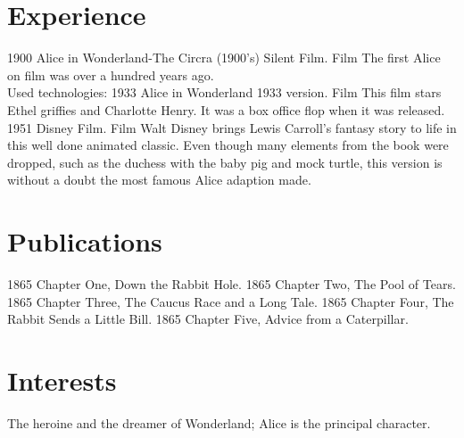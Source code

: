 \documentclass[letterpaper]{curriculum_vitae} %
\begin{document}
\section{Experience}
\begin{twenty}
    \twentyitem
    {1900}
    {Alice in Wonderland-The Circra (1900's) Silent Film.}
    {Film}
    {
        The first Alice on film was over a hundred years ago.\\
        Used technologies: 
    }
    \twentyitem
    {1933}
    {Alice in Wonderland 1933 version.}
    {Film}
    {This film stars Ethel griffies and Charlotte Henry. It was a box office flop when it was released.}
    \twentyitem
    {1951}
    {Disney Film.}
    {Film}
    {Walt Disney brings Lewis Carroll's fantasy story to life in this well done animated classic. Even though many elements from the book were dropped, such as the duchess with the baby pig and mock turtle, this version is without a doubt the most famous Alice adaption made.}
\end{twenty}

\newpage

\makenextprofile

\section{Publications}
\begin{twentyshort}
  \twentyitemshort
    {1865}
    {Chapter One, Down the Rabbit Hole.}
  \twentyitemshort
    {1865}
    {Chapter Two, The Pool of Tears.}
  \twentyitemshort
    {1865}
    {Chapter Three,  The Caucus Race and a Long Tale.}
  \twentyitemshort
    {1865}
    {Chapter Four,  The Rabbit Sends a Little Bill.}
  \twentyitemshort
    {1865}
    {Chapter Five,  Advice from a Caterpillar.}
\end{twentyshort}

\section{Interests}
The heroine and the dreamer of Wonderland;  Alice is the principal character.
\end{document}
